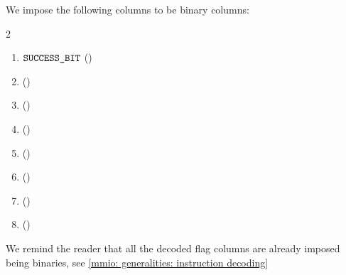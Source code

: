 We impose the following columns to be binary columns:
\begin{multicols}{2}
    \begin{enumerate}
	\item $\texttt{SUCCESS\_BIT}{}$ \quad (\trash)
	\item \fastOp{} \quad (\trash)
	\item \slowOp{} \quad (\trash)
	\item {} \quad (\trash)
	\item {} \quad (\trash)
	\item {} \quad (\trash)
	\item {} \quad (\trash)
	\item {} \quad (\trash)
    \end{enumerate}
\end{multicols}

We remind the reader that all the decoded flag columns are already imposed being binaries, see \ref{mmio: generalities: instruction decoding}
